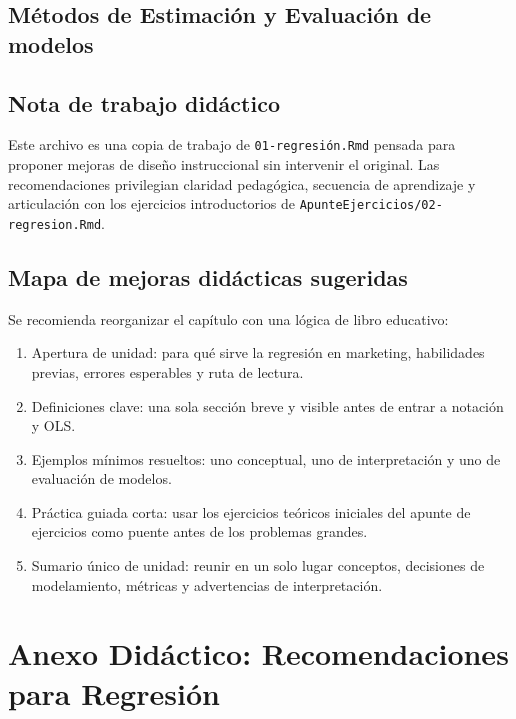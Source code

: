\documentclass[
]{book}
\providecommand{\tightlist}{%
  \setlength{\itemsep}{0pt}\setlength{\parskip}{0pt}}
\begin{document}
\section{Métodos de Estimación y Evaluación de modelos}\label{muxe9todos-de-estimaciuxf3n-y-evaluaciuxf3n-de-modelos}

\section*{Nota de trabajo didáctico}\label{nota-de-trabajo-diduxe1ctico}

Este archivo es una copia de trabajo de \texttt{01-regresión.Rmd} pensada para
proponer mejoras de diseño instruccional sin intervenir el original.
Las recomendaciones privilegian claridad pedagógica, secuencia de
aprendizaje y articulación con los ejercicios introductorios de
\texttt{ApunteEjercicios/02-regresion.Rmd}.

\section*{Mapa de mejoras didácticas sugeridas}\label{mapa-de-mejoras-diduxe1cticas-sugeridas}

Se recomienda reorganizar el capítulo con una lógica de libro
educativo:

\begin{enumerate}
\def\labelenumi{\arabic{enumi}.}
\tightlist
\item
  Apertura de unidad: para qué sirve la regresión en marketing,
  habilidades previas, errores esperables y ruta de lectura.
\item
  Definiciones clave: una sola sección breve y visible antes de entrar
  a notación y OLS.
\item
  Ejemplos mínimos resueltos: uno conceptual, uno de interpretación y
  uno de evaluación de modelos.
\item
  Práctica guiada corta: usar los ejercicios teóricos iniciales del
  apunte de ejercicios como puente antes de los problemas grandes.
\item
  Sumario único de unidad: reunir en un solo lugar conceptos,
  decisiones de modelamiento, métricas y advertencias de
  interpretación.
\end{enumerate}

\chapter*{Anexo Didáctico: Recomendaciones para Regresión}\label{anexo-diduxe1ctico-recomendaciones-para-regresiuxf3n}
\end{document}
